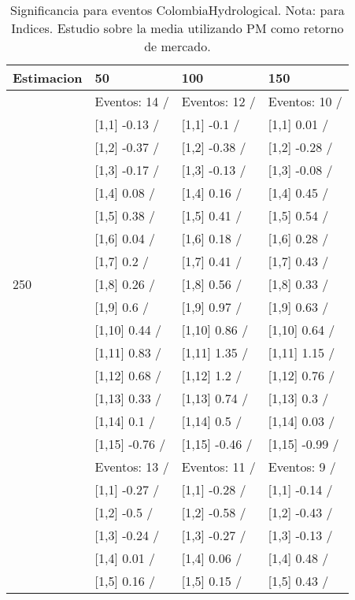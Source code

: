 \begin{table}

\caption{Significancia para eventos ColombiaHydrological. Nota: para Indices. Estudio sobre la media utilizando PM como retorno de mercado.}
\centering
\begin{tabular}[t]{llll}
\toprule
Estimacion & 50 & 100 & 150\\
\midrule
 & Eventos:  14 / & Eventos:  12 / & Eventos:  10 /\\
 & {}[1,1] -0.13  / & {}[1,1] -0.1  / & {}[1,1] 0.01  /\\
 & {}[1,2] -0.37  / & {}[1,2] -0.38  / & {}[1,2] -0.28  /\\
 & {}[1,3] -0.17  / & {}[1,3] -0.13  / & {}[1,3] -0.08  /\\
 & {}[1,4] 0.08  / & {}[1,4] 0.16  / & {}[1,4] 0.45  /\\
\addlinespace
 & {}[1,5] 0.38  / & {}[1,5] 0.41  / & {}[1,5] 0.54  /\\
 & {}[1,6] 0.04  / & {}[1,6] 0.18  / & {}[1,6] 0.28  /\\
 & {}[1,7] 0.2  / & {}[1,7] 0.41  / & {}[1,7] 0.43  /\\
250 & {}[1,8] 0.26  / & {}[1,8] 0.56  / & {}[1,8] 0.33  /\\
 & {}[1,9] 0.6  / & {}[1,9] 0.97  / & {}[1,9] 0.63  /\\
\addlinespace
 & {}[1,10] 0.44  / & {}[1,10] 0.86  / & {}[1,10] 0.64  /\\
 & {}[1,11] 0.83  / & {}[1,11] 1.35  / & {}[1,11] 1.15  /\\
 & {}[1,12] 0.68  / & {}[1,12] 1.2  / & {}[1,12] 0.76  /\\
 & {}[1,13] 0.33  / & {}[1,13] 0.74  / & {}[1,13] 0.3  /\\
 & {}[1,14] 0.1  / & {}[1,14] 0.5  / & {}[1,14] 0.03  /\\
\addlinespace
 & {}[1,15] -0.76  / & {}[1,15] -0.46  / & {}[1,15] -0.99  /\\
 & Eventos:  13 / & Eventos:  11 / & Eventos:  9 /\\
 & {}[1,1] -0.27  / & {}[1,1] -0.28  / & {}[1,1] -0.14  /\\
 & {}[1,2] -0.5  / & {}[1,2] -0.58  / & {}[1,2] -0.43  /\\
 & {}[1,3] -0.24  / & {}[1,3] -0.27  / & {}[1,3] -0.13  /\\
\addlinespace
 & {}[1,4] 0.01  / & {}[1,4] 0.06  / & {}[1,4] 0.48  /\\
 & {}[1,5] 0.16  / & {}[1,5] 0.15  / & {}[1,5] 0.43  /\\

\end{tabular}
\end{table}
